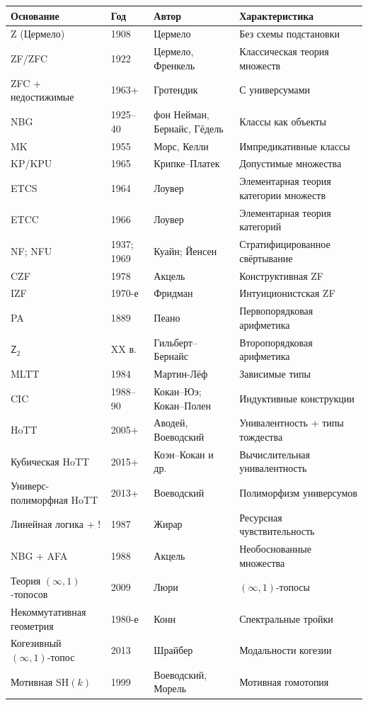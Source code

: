 \documentclass[11pt]{article}
\theoremstyle{plain}
\theoremstyle{definition}
\begin{document}
\begin{longtable}{@{}p{3.8cm}l p{4cm} p{4.6cm}@{}}
\toprule
Основание & Год & Автор & Характеристика \\ \midrule
Z (Цермело) & 1908 & Цермело & Без схемы подстановки \\
ZF/ZFC & 1922 & Цермело, Френкель & Классическая теория множеств \\
ZFC + недостижимые & 1963+ & Гротендик & С универсумами \\
NBG & 1925--40 & фон Нейман, Бернайс, Гёдель & Классы как объекты \\
MK & 1955 & Морс, Келли & Импредикативные классы \\
KP/KPU & 1965 & Крипке--Платек & Допустимые множества \\
ETCS & 1964 & Лоувер & Элементарная теория категории множеств \\
ETCC & 1966 & Лоувер & Элементарная теория категорий \\
NF; NFU & 1937; 1969 & Куайн; Йенсен & Стратифицированное свёртывание \\
CZF & 1978 & Акцель & Конструктивная ZF \\
IZF & 1970-е & Фридман & Интуиционистская ZF \\
PA & 1889 & Пеано & Первопорядковая арифметика \\
$\mathsf{Z}_2$ & XX в. & Гильберт--Бернайс & Второпорядковая арифметика \\
MLTT & 1984 & Мартин-Лёф & Зависимые типы \\
CIC & 1988--90 & Кокан--Юэ; Кокан--Полен & Индуктивные конструкции \\
HoTT & 2005+ & Аводей, Воеводский & Унивалентность + типы тождества \\
Кубическая HoTT & 2015+ & Коэн--Кокан и др. & Вычислительная унивалентность \\
Универс-полиморфная HoTT & 2013+ & Воеводский & Полиморфизм универсумов \\
Линейная логика + ! & 1987 & Жирар & Ресурсная чувствительность \\
NBG + AFA & 1988 & Акцель & Необоснованные множества \\
Теория $(\infty, 1)$-топосов & 2009 & Люри & $(\infty, 1)$-топосы \\
Некоммутативная геометрия & 1980-е & Конн & Спектральные тройки \\
Когезивный $(\infty, 1)$-топос & 2013 & Шрайбер & Модальности когезии \\
Мотивная $\mathrm{SH}(k)$ & 1999 & Воеводский, Морель & Мотивная гомотопия \\

\end{longtable}
\end{document}
